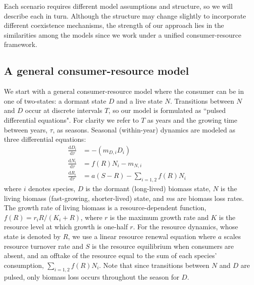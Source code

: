 \documentclass[12pt]{article}
\begin{document}
Each scenario requires different model assumptions and structure, so we will describe each in turn. Although the structure may change slightly to incorporate different coexistence mechanisms, the strength of our approach lies in the similarities among the models since we work under a unified consumer-resource framework.

\subsection{A general consumer-resource model}
We start with a general consumer-resource model where the consumer can be in one of two-states: a dormant state $D$ and a live state $N$. Transitions between $N$ and $D$ occur at discrete intervals $T$, so our model is formulated as ``pulsed differential equations". For clarity we refer to $T$ as years and the growing time between years, $\tau$, as seasons. Seasonal (within-year) dynamics are modeled as three differential equations:
\begin{align}
\frac{\text{d}D_{i}}{\text{d}\tau} &= -(m_{D,i}D_{i})\\
\frac{\text{d}N_{i}}{\text{d}\tau} &= f(R)N_{i} - m_{N,i}\\
\frac{\text{d}R_{i}}{\text{d}\tau} &= a(S - R) - \sum\limits_{i=1,2}f(R)N_{i}
\end{align}
where $i$ denotes species, $D$ is the dormant (long-lived) biomass state, $N$ is the living biomass (fast-growing, shorter-lived) state, and $m$s are biomass loss rates. The growth rate of living biomass is a resource-dependent function, $f(R) = r_{i}R/(K_{i}+R)$, where $r$ is the maximum growth rate and $K$ is the resource level at which growth is one-half $r$. For the resource dynamics, whose state is denoted by $R$, we use a linear resource renewal equation where $a$ scales resource turnover rate and $S$ is the resource equilibrium when consumers are absent, and an offtake of the resource equal to the sum of each species' consumption, $\sum_{i=1,2}f(R)N_{i}$. Note that since transitions between $N$ and $D$ are pulsed, only biomass loss occurs throughout the season for $D$.
\end{document}
